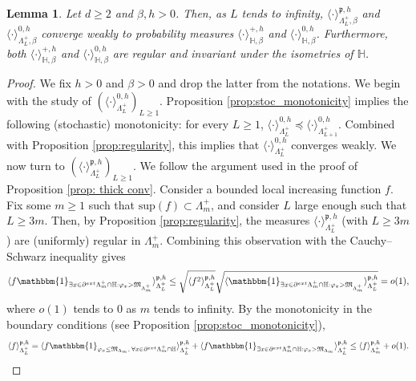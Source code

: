 \documentclass[11pt,a4paper]{article}
\newtheorem{lemma}[theorem]{Lemma}
\theoremstyle{definition}
\numberwithin{equation}{section}
\begin{document}
\begin{lemma}\label{lem: existence of phi4 halspace measures} Let $d\geq 2$ and $\beta,h>0$. Then, as $L$ tends to infinity, $\langle \cdot \rangle^{\mathfrak p,h}_{\Lambda_L^+,\beta}$ and $\langle \cdot \rangle^{0,h}_{\Lambda_L^+,\beta}$ converge weakly to probability measures $\langle \cdot \rangle^{+,h}_{\mathbb{H},\beta}$ and $\langle \cdot \rangle^{0,h}_{\mathbb{H},\beta}$. Furthermore, both $\langle \cdot \rangle^{+,h}_{\mathbb{H},\beta}$ and $\langle \cdot \rangle^{0,h}_{\mathbb{H},\beta}$ are regular and invariant under the isometries of $\mathbb H$.
\end{lemma}
\begin{proof} We fix $h>0$ and $\beta>0$ and drop the latter from the notations.
We begin with the study of $(\langle \cdot\rangle_{\Lambda_L^+}^{0,h})_{L\geq 1}$. Proposition \ref{prop:stoc_monotonicity} implies the following (stochastic) monotonicity: for every $L\geq 1$, $\langle \cdot \rangle^{0,h}_{\Lambda_L^+} \preceq \langle \cdot \rangle^{0,h}_{\Lambda_{L+1}^+}$. Combined with Proposition \ref{prop:regularity}, this implies that $\langle \cdot \rangle^{0,h}_{\Lambda_L^+}$ converges weakly. 
We now turn to $(\langle \cdot\rangle_{\Lambda_L^+}^{\mathfrak p,h})_{L\geq 1}$. We follow the argument used in the proof of Proposition \ref{prop: thick conv}. Consider a bounded local increasing function $f$. Fix some $m\geq 1$ such that $\mathrm{sup}(f)\subset \Lambda_m^+$, and consider $L$ large enough such that $L\geq 3m$. Then, by Proposition \ref{prop:regularity}, the measures $\langle \cdot \rangle^{\mathfrak p,h}_{\Lambda_L^+}$ (with $L\geq 3m$) are (uniformly) regular in $\Lambda_m^+$. Combining this observation with the Cauchy--Schwarz inequality gives
\begin{equation}
\langle f \mathbbm{1}_{\exists x \in \partial^{\rm ext} \Lambda_m^+\cap\mathbb H : \varphi_x> \mathfrak{M}_{\Lambda_m^+}} \rangle^{\mathfrak p,h}_{\Lambda_L^+} \leq \sqrt{\langle f^2 \rangle^{\mathfrak p,h}_{\Lambda_L^+}} \sqrt{\langle \mathbbm{1}_{\exists x \in \partial^{\rm ext} \Lambda_m^+\cap\mathbb H : \varphi_x> \mathfrak{M}_{\Lambda_m^+}} \rangle^{\mathfrak p,h}_{\Lambda_L^+}}=o(1),
\end{equation}
where $o(1)$ tends to $0$ as $m$ tends to infinity.
By the monotonicity in the boundary conditions (see Proposition \ref{prop:stoc_monotonicity}),
\begin{equation}
\langle f \rangle^{\mathfrak p,h}_{\Lambda_L^+}=\langle f \mathbbm{1}_{\varphi_x\leq \mathfrak{M}_{\Lambda_m},\: \forall x \in \partial^{\rm ext} \Lambda_m^+\cap\mathbb H} \rangle^{\mathfrak p,h}_{\Lambda_L^+}+\langle f \mathbbm{1}_{\exists x \in \partial^{\rm ext} \Lambda_m^+\cap\mathbb H: \varphi_x> \mathfrak{M}_{\Lambda_m}} \rangle^{\mathfrak p,h}_{\Lambda_L^+}\leq \langle f \rangle^{\mathfrak p,h}_{\Lambda_m^+}+o(1).   

\end{equation}
\end{proof}
\end{document}
